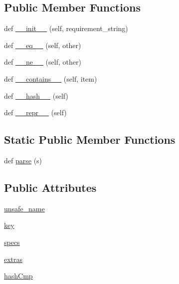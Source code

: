 \subsection*{Public Member Functions}
\begin{DoxyCompactItemize}
\item 
def \hyperlink{classpip_1_1__vendor_1_1pkg__resources_1_1Requirement_ad01107aada7d4ac147391620e7ff1b56}{\+\_\+\+\_\+init\+\_\+\+\_\+} (self, requirement\+\_\+string)
\item 
def \hyperlink{classpip_1_1__vendor_1_1pkg__resources_1_1Requirement_a0f8508e55ffc898183096dbbd45802e6}{\+\_\+\+\_\+eq\+\_\+\+\_\+} (self, other)
\item 
def \hyperlink{classpip_1_1__vendor_1_1pkg__resources_1_1Requirement_a961e5114214f8e29d20c66b5450a0761}{\+\_\+\+\_\+ne\+\_\+\+\_\+} (self, other)
\item 
def \hyperlink{classpip_1_1__vendor_1_1pkg__resources_1_1Requirement_a89a322f070fca6884f9005be8ec578b3}{\+\_\+\+\_\+contains\+\_\+\+\_\+} (self, item)
\item 
def \hyperlink{classpip_1_1__vendor_1_1pkg__resources_1_1Requirement_a68622366168b5b4a0a4614a73a2260c2}{\+\_\+\+\_\+hash\+\_\+\+\_\+} (self)
\item 
def \hyperlink{classpip_1_1__vendor_1_1pkg__resources_1_1Requirement_a995f69c53e5932fa3a4b535cb06129fe}{\+\_\+\+\_\+repr\+\_\+\+\_\+} (self)
\end{DoxyCompactItemize}
\subsection*{Static Public Member Functions}
\begin{DoxyCompactItemize}
\item 
def \hyperlink{classpip_1_1__vendor_1_1pkg__resources_1_1Requirement_a804762a97dbf4272d5a33561dda5f82b}{parse} (s)
\end{DoxyCompactItemize}
\subsection*{Public Attributes}
\begin{DoxyCompactItemize}
\item 
\hyperlink{classpip_1_1__vendor_1_1pkg__resources_1_1Requirement_aae165d71759f9b342e50e509a8882b27}{unsafe\+\_\+name}
\item 
\hyperlink{classpip_1_1__vendor_1_1pkg__resources_1_1Requirement_a67311882f033af220ec23e3ac88f7aa2}{key}
\item 
\hyperlink{classpip_1_1__vendor_1_1pkg__resources_1_1Requirement_af004e7a9cec2a9c9586073a3ad453d2b}{specs}
\item 
\hyperlink{classpip_1_1__vendor_1_1pkg__resources_1_1Requirement_a6511d03e40be9ea82ea2b4a46f7cb557}{extras}
\item 
\hyperlink{classpip_1_1__vendor_1_1pkg__resources_1_1Requirement_a0857cc2b44da8638f43a6f3b51bb7441}{hash\+Cmp}
\end{DoxyCompactItemize}



